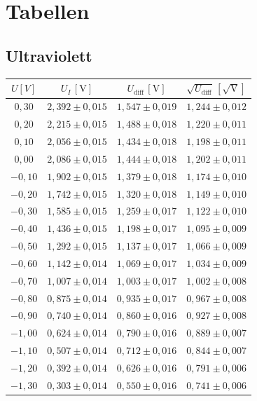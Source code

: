 \onecolumn
\chapter{Tabellen}

\section{Ultraviolett}
\begin{table}[h!]
    \centering
    \begin{tabular}{c | ccc}
    \hline
    $U [V]$ & $U_I \, [\mathrm{V}]$ & $U_{\text{diff}} \, [\mathrm{V}]$ & $\sqrt{U_{\text{diff}}} \, [\mathrm{\sqrt{V}}]$ \\
    \hline
    $0,30$ & $2,392 \pm 0,015$ & $1,547 \pm 0,019$ & $1,244 \pm 0,012$ \\
    $0,20$ & $2,215 \pm 0,015$ & $1,488 \pm 0,018$ & $1,220 \pm 0,011$ \\
    $0,10$ & $2,056 \pm 0,015$ & $1,434 \pm 0,018$ & $1,198 \pm 0,011$ \\
    $0,00$ & $2,086 \pm 0,015$ & $1,444 \pm 0,018$ & $1,202 \pm 0,011$ \\
    $-0,10$ & $1,902 \pm 0,015$ & $1,379 \pm 0,018$ & $1,174 \pm 0,010$ \\
    $-0,20$ & $1,742 \pm 0,015$ & $1,320 \pm 0,018$ & $1,149 \pm 0,010$ \\
    $-0,30$ & $1,585 \pm 0,015$ & $1,259 \pm 0,017$ & $1,122 \pm 0,010$ \\
    $-0,40$ & $1,436 \pm 0,015$ & $1,198 \pm 0,017$ & $1,095 \pm 0,009$ \\
    $-0,50$ & $1,292 \pm 0,015$ & $1,137 \pm 0,017$ & $1,066 \pm 0,009$ \\
    $-0,60$ & $1,142 \pm 0,014$ & $1,069 \pm 0,017$ & $1,034 \pm 0,009$ \\
    $-0,70$ & $1,007 \pm 0,014$ & $1,003 \pm 0,017$ & $1,002 \pm 0,008$ \\
    $-0,80$ & $0,875 \pm 0,014$ & $0,935 \pm 0,017$ & $0,967 \pm 0,008$ \\
    $-0,90$ & $0,740 \pm 0,014$ & $0,860 \pm 0,016$ & $0,927 \pm 0,008$ \\
    $-1,00$ & $0,624 \pm 0,014$ & $0,790 \pm 0,016$ & $0,889 \pm 0,007$ \\
    $-1,10$ & $0,507 \pm 0,014$ & $0,712 \pm 0,016$ & $0,844 \pm 0,007$ \\
    $-1,20$ & $0,392 \pm 0,014$ & $0,626 \pm 0,016$ & $0,791 \pm 0,006$ \\
    $-1,30$ & $0,303 \pm 0,014$ & $0,550 \pm 0,016$ & $0,741 \pm 0,006$ \\

\end{tabular}
\end{table}
